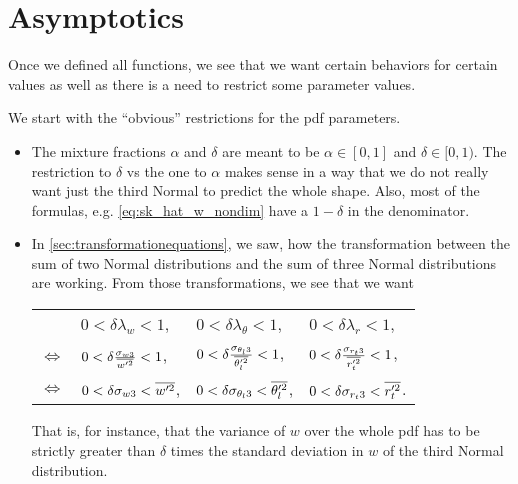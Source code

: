\chapter{Asymptotics}\label{ch:asymptotics}

Once we defined all functions, we see that we want certain behaviors for certain values as well as there is a need to restrict some parameter values.

We start with the \enquote{obvious} restrictions for the \gls{pdf} parameters.
\begin{itemize}
    \item The mixture fractions $\alpha$ and $\delta$ are meant to be $\alpha \in [0,1]$ and $\delta \in [0,1)$.
    The restriction to $\delta$ vs the one to $\alpha$ makes sense in a way that we do not really want just the third Normal to predict the whole shape.
    Also, most of the formulas, e.g. \cref{eq:sk_hat_w_nondim} have a $1-\delta$ in the denominator.

    \item In \cref{sec:transformationequations}, we saw, how the transformation between the sum of two Normal distributions and the sum of three Normal distributions are working.
    From those transformations, we see that we want
    \begin{table}[!ht]
        \centering
        \begin{tabular}{llll}
            &
            $0 < \delta\lambda_w < 1$, &
            $0 < \delta\lambda_\theta < 1$, &
            $0 < \delta\lambda_r < 1$, \\
            $\iff$ &
            $0 < \delta\frac{\sigma_{w3}}{\overline{w'^2}} < 1$, &
            $0 < \delta\frac{\sigma_{\theta_l 3}}{\overline{\theta_l'^2}} < 1$, &
            $0 < \delta\frac{\sigma_{r_t 3}}{\overline{r_t'^2}} < 1$, \\
            $\iff$ &
            $0 < \delta\sigma_{w3} < \overline{w'^2}$, &
            $0 < \delta\sigma_{\theta_l 3} < \overline{\theta_l'^2}$, &
            $0 < \delta\sigma_{r_t 3} < \overline{r_t'^2}$.
        \end{tabular}
    \end{table}
    That is, for instance, that the variance of $w$ over the whole \gls{pdf} has to be strictly greater than $\delta$ times the standard deviation in $w$ of the third Normal distribution.
\end{itemize}

